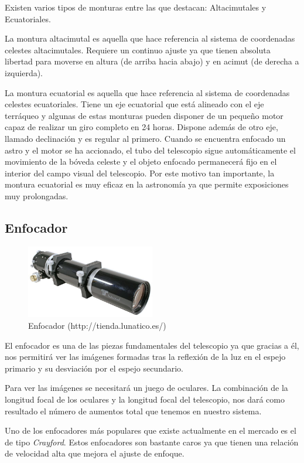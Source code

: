 Existen varios tipos de monturas entre las que destacan: Altacimutales y Ecuatoriales.

La montura altacimutal es aquella que hace referencia al sistema de coordenadas celestes altacimutales. Requiere un continuo ajuste ya que tienen absoluta libertad para moverse en altura (de arriba hacia abajo) y en acimut (de derecha a izquierda).

La montura ecuatorial es aquella que hace referencia al sistema de coordenadas celestes ecuatoriales. Tiene un eje ecuatorial que está alineado con el eje terráqueo y algunas de estas monturas pueden disponer de un pequeño motor capaz de realizar un giro completo en 24 horas. Dispone además de otro eje, llamado declinación y es regular al primero.
Cuando se encuentra enfocado un astro y el motor se ha accionado, el tubo del telescopio sigue automáticamente el movimiento de la bóveda celeste y el objeto enfocado permanecerá fijo en el interior del campo visual del telescopio. Por este motivo tan importante, la montura ecuatorial es muy eficaz en la astronomía ya que permite exposiciones muy prolongadas.


\subsection{Enfocador}
\begin{figure}[htb]
\centering
\includegraphics[width=0.5\textwidth]{./imagenes/enfocador}
\caption{Enfocador (http://tienda.lunatico.es/)} \label{fig:enfocador}
\end{figure}
El enfocador es una de las piezas fundamentales del telescopio ya que gracias a él, nos permitirá ver las imágenes formadas tras la reflexión de la luz en el espejo primario y su desviación por el espejo secundario.

Para ver las imágenes se necesitará un juego de oculares. La combinación de la longitud focal de los oculares y la longitud focal del telescopio, nos dará como resultado el número de aumentos total que tenemos en nuestro sistema.

Uno de los enfocadores más populares que existe actualmente en el mercado es el de tipo \textit{Crayford}. Estos enfocadores son bastante caros ya que tienen una relación de velocidad alta que mejora el ajuste de enfoque.


